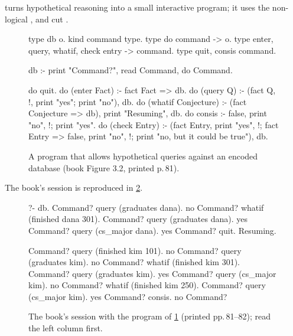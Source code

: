 { turns hypothetical reasoning into a small interactive program; it uses the
non-logical ,  and cut \lp{!} .

\begin{figure}[t]
\begin{lprolog}
type db                           o.
kind command                      type.
type do                           command -> o.
type enter, query, whatif, check  entry -> command.
type quit, consis                 command.

db :- print "Command?", read Command, do Command.

do quit.
do (enter Fact) :- fact Fact => db.
do (query Q) :- (fact Q, !, print "yes\n"; print "no\n"), db.
do (whatif Conjecture) :- (fact Conjecture => db),
                          print "Resuming\n", db.
do consis :- false, print "no\n", !; print "yes\n".
do (check Entry) :- (fact Entry, print "yes\n", !;
                    fact Entry => false, print "no\n", !;
                    print "no, but it could be true\n"),  db.
\end{lprolog}
\caption{A program that allows hypothetical queries against an encoded database (book Figure 3.2,
printed p.\,81).}
\label{fig:hh-dbloop}
\end{figure}

The book's session  is reproduced in \cref{fig:hh-session}.

\begin{figure}[t]
\noindent\begin{minipage}[t]{0.49\linewidth}
\begin{answers}
?- db.
Command? query (graduates dana).
no
Command? whatif (finished dana 301).
Command? query (graduates dana).
yes
Command? query (cs_major dana).
yes
Command? quit.
Resuming.
\end{answers}
\end{minipage}\hfill
\begin{minipage}[t]{0.49\linewidth}
\begin{answers}
Command? query (finished kim 101).
no
Command? query (graduates kim).
no
Command? whatif (finished kim 301).
Command? query (graduates kim).
yes
Command? query (cs_major kim).
no
Command? whatif (finished kim 250).
Command? query (cs_major kim).
yes
Command? consis.
no
Command?
\end{answers}
\end{minipage}
\caption{The book's session with the program of \cref{fig:hh-dbloop} (printed pp.\,81--82); read the
left column first.}
\label{fig:hh-session}
\end{figure}


}
